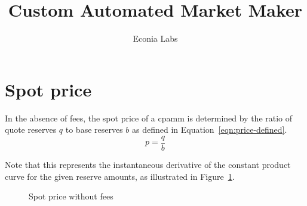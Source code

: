 \documentclass[table, twocolumn]{article}
\title{Custom Automated Market Maker}
\author{Econia Labs}
\date{}
\begin{document}
\maketitle

\section{Spot price}\label{sec:spot-price}

In the absence of fees, the spot price of a \gls*{cpamm} is determined by the ratio of
quote reserves $q$ to base reserves $b$ as defined in Equation~\ref{eqn:price-defined}.
\begin{equation}\label{eqn:price-defined}
  p = \frac{q}{b}
\end{equation}

Note that this represents the instantaneous derivative of the constant product curve
for the given reserve amounts, as illustrated in Figure~\ref{fig:spot-price-no-fees}.

\begin{figure}[!htb]
	\centering
	
	\caption{Spot price without fees}\label{fig:spot-price-no-fees}
\end{figure}
\end{document}
